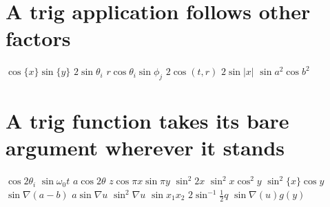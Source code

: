 \documentclass{article}
\begin{document}
\section{A trig application follows other factors}
$\cos\{x\}\sin\{y\}$ $2\sin\theta_i$ $r\cos\theta_i\sin\phi_j$ $2\cos(t,r)$ $2\sin|x|$ $\sin a^2\cos b^2$

\section{A trig function takes its bare argument wherever it stands}
$\cos 2\theta_i$ $\sin\omega_0 t$ $a\cos 2\theta$ $z\cos\pi x\sin\pi y$ $\sin^2 2x$ $\sin^2 x\cos^2 y$
$\sin^2\{x\}\cos y$ $\sin\nabla(a-b)$ $a\sin\nabla u$ $\sin^2\nabla u$ $\sin x_1x_2$ $2\sin^{-1}\frac12 q$
$\sin\nabla(u)g(y)$

\end{document}
